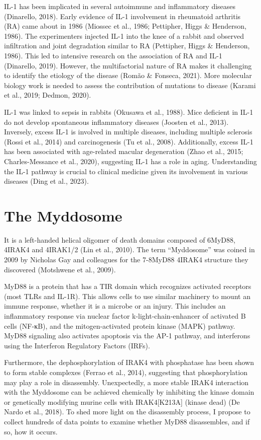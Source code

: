IL-1 has been implicated in several autoimmune and inflammatory diseases (Dinarello, 2018). Early evidence of IL-1 involvement in rheumatoid arthritis (RA) came about in 1986 (Miossec et al., 1986; Pettipher, Higgs \& Henderson, 1986). The experimenters injected IL-1 into the knee of a rabbit and observed infiltration and joint degradation similar to RA (Pettipher, Higgs \& Henderson, 1986). This led to intensive research on the association of RA and IL-1 (Dinarello, 2019). However, the multifactorial nature of RA makes it challenging to identify the etiology of the disease (Romão \& Fonseca, 2021). More molecular biology work is needed to assess the contribution of mutations to disease (Karami et al., 2019; Dedmon, 2020).

IL-1 was linked to sepsis in rabbits (Okusawa et al., 1988). Mice deficient in IL-1{\textbeta} do not develop spontaneous inflammatory diseases (Joosten et al., 2013). Inversely, excess IL-1{\textbeta} is involved in multiple diseases, including multiple sclerosis (Rossi et al., 2014) and carcinogenesis (Tu et al., 2008). Additionally, excess IL-1{\textbeta} has been associated with age-related macular degeneration (Zhao et al., 2015; Charles-Messance et al., 2020), suggesting IL-1 has a role in aging. Understanding the IL-1 pathway is crucial to clinical medicine given its involvement in various diseases (Ding et al., 2023).

\section{The Myddosome}
\label{section:Myddosome}
It is a left-handed helical oligomer of death domains composed of 6\times MyD88, 4\times IRAK4 and 4\times IRAK1/2 (Lin et al., 2010). The term “Myddosome” was coined in 2009 by Nicholas Gay and colleagues for the 7-8\times MyD88 4\times IRAK4 structure they discovered (Motshwene et al., 2009).

MyD88 is a protein that has a TIR domain which recognizes activated receptors (most TLRs and IL-1R). This allows cells to use similar machinery to mount an immune response, whether it is a microbe or an injury. This includes an inflammatory response via nuclear factor k-light-chain-enhancer of activated B cells (NF-κB), and the mitogen-activated protein kinase (MAPK) pathway. MyD88 signaling also activates apoptosis via the AP-1 pathway, and interferons using the Interferon Regulatory Factors (IRFs).

Furthermore, the dephosphorylation of IRAK4 with phosphatase has been shown to form stable complexes (Ferrao et al., 2014), suggesting that phosphorylation may play a role in disassembly. Unexpectedly, a more stable IRAK4 interaction with the Myddosome can be achieved chemically by inhibiting the kinase domain or genetically modifying murine cells with IRAK4[K213A] (kinase dead) (De Nardo et al., 2018). To shed more light on the disassembly process, I propose to collect hundreds of data points to examine whether MyD88 disassembles, and if so, how it occurs.

